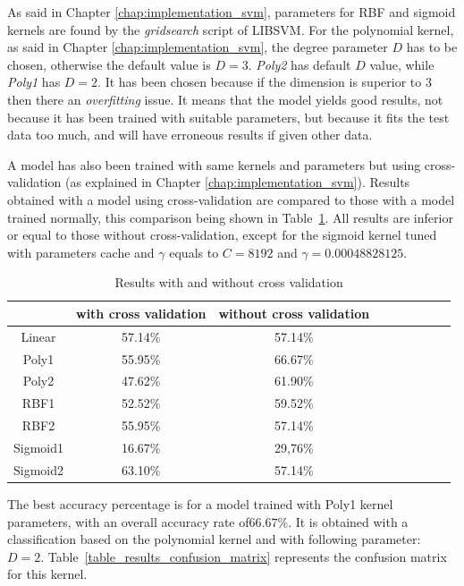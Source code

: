 \noindent As said in Chapter \ref{chap:implementation_svm}, parameters for RBF and sigmoid kernels are found by the \textit{gridsearch} script of LIBSVM. For the polynomial kernel, as said in Chapter \ref{chap:implementation_svm}, the degree parameter $D$ has to be chosen, otherwise the default value is $D=3$. \textit{Poly2} has default $D$ value, while \textit{Poly1} has $D = 2$. It has been chosen because if the dimension is superior to $3$ then there an \textit{overfitting} issue. It means that the model yields good results, not because it has been trained with suitable parameters, but because it fits the test data too much, and will have erroneous results if given other data.
\newline

\noindent A model has also been trained with same kernels and parameters but using cross-validation (as explained in Chapter \ref{chap:implementation_svm}). Results obtained with a model using cross-validation are compared to those with a model trained normally, this comparison being shown in  Table~\ref{table_results_crossvalidation}. All results are inferior or equal to those without cross-validation, except for the sigmoid kernel tuned with parameters cache and $\gamma$ equals to $ C = 8192 $ and $ \gamma = 0.00048828125 $.
\newline

\begin{table}[h]
\begin{center}
   \caption{\label{table_results_crossvalidation} Results with and without cross validation}
\begin{tabular}{|c|c|c|c|c|c|c|c|c|}
  \hline
    & with cross validation & without cross validation \\
  \hline
  Linear & 57.14\% & 57.14\% \\
  Poly1 & 55.95\% & 66.67\% \\
  Poly2 & 47.62\% & 61.90\% \\
  RBF1 & 52.52\% & 59.52\% \\
  RBF2 & 55.95\% & 57.14\% \\
  Sigmoid1 & 16.67\% & 29,76\% \\
  Sigmoid2 & 63.10\% & 57.14\% \\
  \hline
\end{tabular}
\end{center}
\end{table}

\noindent The best accuracy percentage is for a model trained with Poly1 kernel parameters, with an overall accuracy rate of$ 66.67\% $. It is obtained with a classification based on the polynomial kernel and with following parameter: $ D = 2 $. Table~\ref{table_results_confusion_matrix} represents the confusion matrix for this kernel.
\newline

